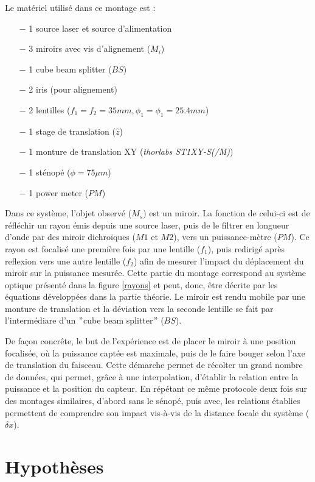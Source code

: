 \documentclass[11pt,letterpaper]{article}
\begin{document}
Le matériel utilisé dans ce montage est :

\begin{itemize}
    \item[$-$]  1 source laser et source d’alimentation
    \item[$-$]  3 miroirs avec vis d’alignement ($M_i$)
    \item[$-$]  1 cube beam splitter ($BS$)
    \item[$-$]  2 iris (pour alignement)
    \item[$-$]  2 lentilles ($f_1 = f_2 = 35 mm, \phi_1 = \phi_1 = 25.4 mm$)
    \item[$-$]  1 stage de translation ($\hat{z}$)
    \item[$-$]  1 monture de translation XY (\textit{thorlabs ST1XY-S(/M)})
    \item[$-$]  1 sténopé ($\phi = 75\mu m$)
    \item[$-$]  1 power meter ($PM$)
\end{itemize}

Dans ce système, l'objet observé ($M_s$) est un miroir. La fonction de celui-ci est de réfléchir un rayon émis depuis une source laser, puis de le filtrer en longueur d'onde par des miroir dichroïques ($M1$ et $M2$), vers un puissance-mètre ($PM$). Ce rayon est focalisé une première fois par une lentille ($f_1$), puis redirigé après reflexion vers une autre lentille ($f_2$) afin de mesurer l'impact du déplacement du miroir sur la puissance mesurée. Cette partie du montage correspond au système optique présenté dans la figure \ref{rayons} et peut, donc, être décrite par les équations développées dans la partie théorie. Le miroir est rendu mobile par une monture de translation et la déviation vers la seconde lentille se fait par l'intermédiare d'un $"$cube beam splitter$"$ ($BS$).

De façon concrête, le but de l'expérience est de placer le miroir à une position focalisée, où la puissance captée est maximale, puis de le faire bouger selon l'axe de translation du faisceau. Cette démarche permet de récolter un grand nombre de données, qui permet, grâce à une interpolation, d'établir la relation entre la puissance et la position du capteur. En répétant ce même protocole deux fois sur des montages similaires, d'abord sans le sénopé, puis avec, les relations établies permettent de comprendre son impact vis-à-vis de la distance focale du système ($\delta x$). 

\section{Hypothèses}
\end{document}
